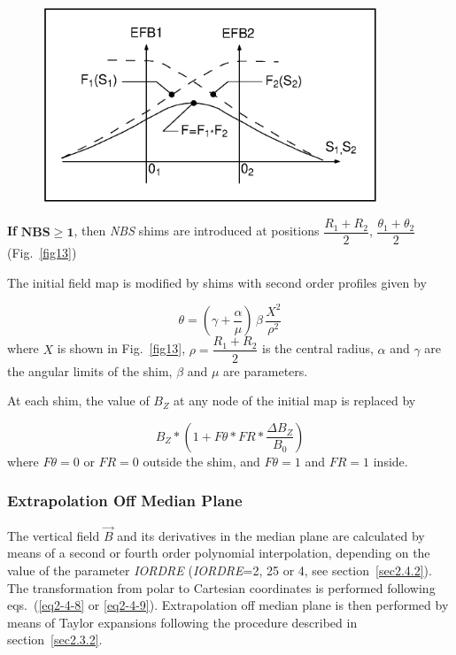 \vfill
\begin{figure}[H]
\centerline{\includegraphics[width=10cm]{Fig12.ps}}
{\setlength{\captionwidth}{13cm}
}
\end{figure}

\newpage


\noindent\textbf{If } $\mathbf{NBS \geq 1}$, then \textsl{NBS} shims are introduced at
positions $ \dfrac{R_1+R_2 }{ 2}$, $\dfrac{\theta_ 1+\theta_ 2 }{ 2} $  
(Fig.~\ref{fig13})~\cite{Biblio13}  %

\noindent The initial field map is modified by shims with second order
profiles given by 

$$ \theta  = \left(\gamma  + \dfrac{\alpha }{ \mu} \right) 
       \,\beta  \, \dfrac{X^2 }{\rho^ 2} $$
%
 where $ X $ is shown in  Fig.~\ref{fig13},  
 $ \rho =\dfrac{R_1+R_2 }{ 2}$ is 
the central radius, $\alpha$ and $\gamma$ are the angular limits of the shim, 
$\beta$ and $\mu$ are parameters. 

\noindent At each shim, the value of $ B_Z $ at any node of the initial map is
replaced by 

$$ B_Z \ast  \left(1+F\theta  \ast  FR \ast  \dfrac{\Delta B_Z }{ B_0} \right)
$$
%
 where $ F\theta =0 $ or $ FR=0 $ outside the shim, and $ F\theta =1$ and $ FR=1 $ inside.  

\subsubsection*{Extrapolation Off Median Plane} 

The vertical field $ \vec  B $ and its derivatives in the median plane are 
calculated by means of a second or fourth order polynomial 
interpolation, depending 
on the value of the parameter \textsl{IORDRE} (\textsl{IORDRE}=2, 25 or 4, 
see section~\ref{sec2.4.2}). 
The transformation from polar to Cartesian coordinates is performed 
following eqs.~(\ref{eq2-4-8} or \ref{eq2-4-9}). Extrapolation off median plane is then performed 
by means of Taylor expansions following the procedure described in section~\ref{sec2.3.2}.  


